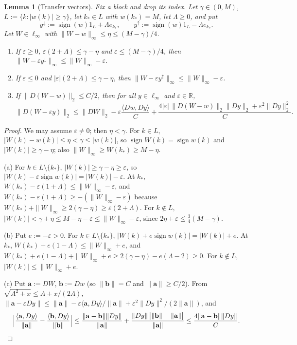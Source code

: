 \documentclass[10pt]{amsart}
\newtheorem{lemma}[theorem]{Lemma}
\theoremstyle{definition}
\theoremstyle{remark}
\newcommand{\sgn}{\operatorname{sign}}
\newcommand{\R}{\mathbb R}
\newcommand{\ip}[2]{\langle #1,#2\rangle}
\begin{document}
\begin{lemma}[Transfer vectors]\label{lem:TV}
Fix a block and drop its index.  Let $\gamma\in(0,M)$,
$L:=\{k:|w(k)|\ge\gamma\}$, let $k_*\in L$ with $w(k_*)=M$, let
$\Lambda\ge0$, and put
\[
 y^{\downarrow}:=\sgn(w)1_L+\Lambda e_{k_*},\qquad
 y^{\uparrow}:=\sgn(w)1_L-\Lambda e_{k_*}.
\]
Let $W\in\ell_\infty$ with $\|W-w\|_\infty\le\eta\le(M-\gamma)/4$.
\begin{enumerate}
\item[(a)] If $\varepsilon\ge0$, $\varepsilon(2+\Lambda)\le\gamma-\eta$ and
$\varepsilon\le(M-\gamma)/4$, then $\|W-\varepsilon y^\downarrow\|_\infty
\le\|W\|_\infty-\varepsilon$.
\item[(b)] If $\varepsilon\le0$ and $|\varepsilon|(2+\Lambda)\le\gamma-\eta$,
then $\|W-\varepsilon y^\uparrow\|_\infty\le\|W\|_\infty-\varepsilon$.
\item[(c)] If $\|D(W-w)\|_2\le C/2$, then for all $y\in\ell_\infty$ and
$\varepsilon\in\R$,
\[
 \|D(W-\varepsilon y)\|_2\le\|DW\|_2-\varepsilon\frac{\ip{Dw}{Dy}}C
 +\frac{4|\varepsilon|\,\|D(W-w)\|_2\|Dy\|_2+\varepsilon^2\|Dy\|_2^2}{C}.
\]
\end{enumerate}
\end{lemma}

\begin{proof}
We may assume $\varepsilon\ne0$; then $\eta<\gamma$.  For $k\in L$,
$|W(k)-w(k)|\le\eta<\gamma\le|w(k)|$, so $\sgn W(k)=\sgn w(k)$ and
$|W(k)|\ge\gamma-\eta$; also $\|W\|_\infty\ge W(k_*)\ge M-\eta$.

(a) For $k\in L\setminus\{k_*\}$, $|W(k)|\ge\gamma-\eta\ge\varepsilon$, so
$|W(k)-\varepsilon\sgn w(k)|=|W(k)|-\varepsilon$.  At $k_*$,
$W(k_*)-\varepsilon(1+\Lambda)\le\|W\|_\infty-\varepsilon$, and
$W(k_*)-\varepsilon(1+\Lambda)\ge-(\|W\|_\infty-\varepsilon)$ because
$W(k_*)+\|W\|_\infty\ge2(\gamma-\eta)\ge\varepsilon(2+\Lambda)$.  For $k\notin
L$, $|W(k)|<\gamma+\eta\le M-\eta-\varepsilon\le\|W\|_\infty-\varepsilon$,
since $2\eta+\varepsilon\le\frac34(M-\gamma)$.

(b) Put $e:=-\varepsilon>0$.  For $k\in L\setminus\{k_*\}$,
$|W(k)+e\sgn w(k)|=|W(k)|+e$.  At $k_*$, $W(k_*)+e(1-\Lambda)\le
\|W\|_\infty+e$, and $W(k_*)+e(1-\Lambda)+\|W\|_\infty+e\ge2(\gamma-\eta)
-e(\Lambda-2)\ge0$.  For $k\notin L$, $|W(k)|\le\|W\|_\infty+e$.

(c) Put $\mathbf a:=DW$, $\mathbf b:=Dw$ (so $\|\mathbf b\|=C$ and
$\|\mathbf a\|\ge C/2$).  From $\sqrt{A^2+x}\le A+x/(2A)$,
$\|\mathbf a-\varepsilon Dy\|\le\|\mathbf a\|-\varepsilon\ip{\mathbf a}{Dy}/
\|\mathbf a\|+\varepsilon^2\|Dy\|^2/(2\|\mathbf a\|)$, and
\[
 \Big|\frac{\ip{\mathbf a}{Dy}}{\|\mathbf a\|}-\frac{\ip{\mathbf b}{Dy}}
 {\|\mathbf b\|}\Big|\le\frac{\|\mathbf a-\mathbf b\|\|Dy\|}{\|\mathbf a\|}
 +\frac{\|Dy\|\,\big|\|\mathbf b\|-\|\mathbf a\|\big|}{\|\mathbf a\|}
 \le\frac{4\|\mathbf a-\mathbf b\|\|Dy\|}{C}.\qedhere
\]
\end{proof}
\end{document}
